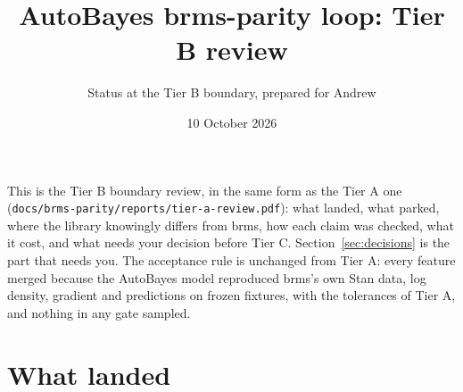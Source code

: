 \documentclass[11pt]{article}
\title{AutoBayes brms-parity loop: Tier B review}
\author{Status at the Tier B boundary, prepared for Andrew}
\date{10 October 2026}
\newcommand{\file}[1]{\texttt{#1}}
\begin{document}
\maketitle

\noindent This is the Tier B boundary review, in the same form as the Tier A one
(\file{docs/brms-parity/reports/tier-a-review.pdf}): what landed, what parked, where the library knowingly differs from
brms, how each claim was checked, what it cost, and what needs your decision before Tier C. Section~\ref{sec:decisions}
is the part that needs you. The acceptance rule is unchanged from Tier A: every feature merged because the AutoBayes
model reproduced brms's own Stan data, log density, gradient and predictions on frozen fixtures, with the tolerances of
Tier A, and nothing in any gate sampled.

\section{What landed}
\label{sec:landed}
\end{document}
